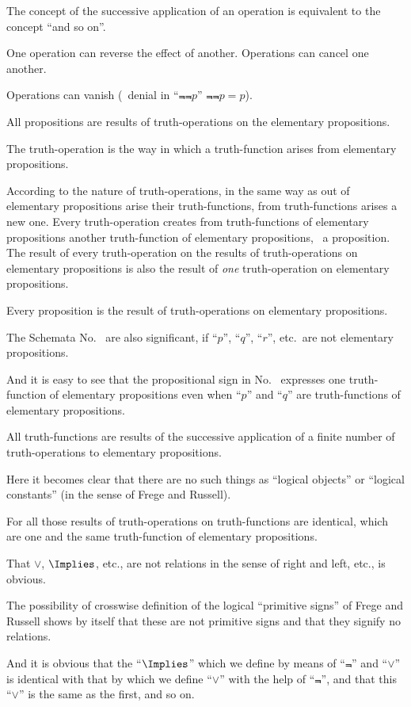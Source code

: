 {The concept of the successive application of
an operation is equivalent to the concept ``and
so on''.}


{One operation can reverse the effect of another.
Operations can cancel one another.}


{Operations can vanish (\exempliGratia\ denial in ``$\Not{\Not{p}}$''
$\Not{\Not{p}} = p$).}


{All propositions are results of truth-operations
on the elementary propositions.

The truth-operation is the way in which a
truth-function arises from elementary propositions.

According to the nature of truth-operations,
in the same way as out of elementary propositions
arise their truth-functions, from truth-func\-tions
arises a new one. Every truth-operation
creates from truth-functions of elementary propositions
another truth-func\-tion of elementary
propositions, \idEst\ a proposition. The result of
every truth-operation on the results of truth-op\-er\-a\-tions
on elementary propositions is also
the result of \emph{one} truth-operation on elementary
propositions.

Every proposition is the result of truth-operations
on elementary propositions.}


{The Schemata No.~ are also significant, if
``$p$'', ``$q$'', ``$r$'', etc.\ are not elementary propositions.

And it is easy to see that the propositional
sign in No.~ expresses one truth-function of
elementary propositions even when ``$p$'' and
``$q$'' are truth-functions of elementary propositions.}


{All truth-functions are results of the successive
application of a finite number of truth-operations
to elementary propositions.}


{Here it becomes clear that there are no such
things as ``logical objects'' or ``logical constants''
(in the sense of Frege and Russell).}


{For all those results of truth-operations on truth-functions
are identical, which are one and the same
truth-function of elementary propositions.}


{That $\lor$, $\Implies$, etc., are not relations in the sense of
right and left, etc., is obvious.

The possibility of crosswise definition of the
logical ``primitive signs'' of Frege and Russell
shows by itself that these are not primitive signs
and that they signify no relations.

And it is obvious that the ``$\Implies$'' which we define
by means of ``$\Not{}$'' and ``$\lor$'' is identical with that
by which we define ``$\lor$'' with the help of ``$\Not{}$'', and
that this ``$\lor$'' is the same as the first, and
so on.}


